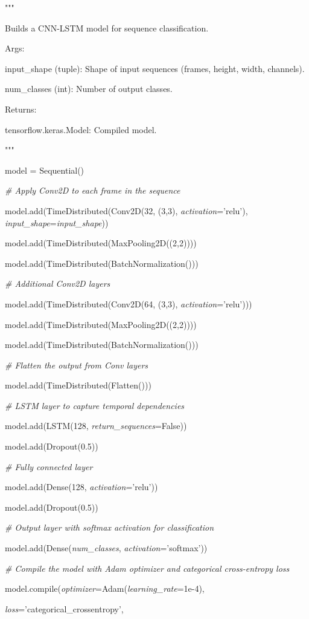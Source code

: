 \documentclass[
]{article}
\begin{document}
"""

Builds a CNN-LSTM model for sequence classification.

Args:

input\_shape (tuple): Shape of input sequences (frames, height, width, channels).

num\_classes (int): Number of output classes.

Returns:

tensorflow.keras.Model: Compiled model.

"""

model = Sequential()

\emph{\# Apply Conv2D to each frame in the sequence}

model.add(TimeDistributed(Conv2D(32, (3,3), \emph{activation}='relu'), \emph{input\_shape}=\emph{input\_shape}))

model.add(TimeDistributed(MaxPooling2D((2,2))))

model.add(TimeDistributed(BatchNormalization()))

\emph{\# Additional Conv2D layers}

model.add(TimeDistributed(Conv2D(64, (3,3), \emph{activation}='relu')))

model.add(TimeDistributed(MaxPooling2D((2,2))))

model.add(TimeDistributed(BatchNormalization()))

\emph{\# Flatten the output from Conv layers}

model.add(TimeDistributed(Flatten()))

\emph{\# LSTM layer to capture temporal dependencies}

model.add(LSTM(128, \emph{return\_sequences}=False))

model.add(Dropout(0.5))

\emph{\# Fully connected layer}

model.add(Dense(128, \emph{activation}='relu'))

model.add(Dropout(0.5))

\emph{\# Output layer with softmax activation for classification}

model.add(Dense(\emph{num\_classes}, \emph{activation}='softmax'))

\emph{\# Compile the model with Adam optimizer and categorical cross-entropy loss}

model.compile(\emph{optimizer}=Adam(\emph{learning\_rate}=1e-4),

\emph{loss}='categorical\_crossentropy',
\end{document}
